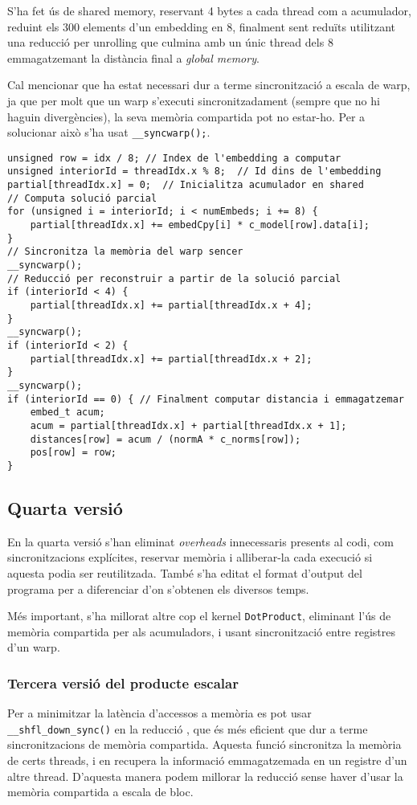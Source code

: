 \documentclass[catalan,10pt,a4paper]{article}
\begin{document}
S'ha fet ús de shared memory, reservant 4 bytes a cada thread com a acumulador, reduint els 300 elements d'un embedding en 8, finalment sent reduïts utilitzant una reducció per unrolling que culmina amb un únic thread dels 8 emmagatzemant la distància final a \textit{global memory}.

Cal mencionar que ha estat necessari dur a terme sincronització a escala de warp, ja que per molt que un warp s'executi sincronitzadament (sempre que no hi haguin divergències), la seva memòria compartida pot no estar-ho. Per a solucionar això s'ha usat \verb|__syncwarp();|.
\begin{verbatim}
unsigned row = idx / 8; // Index de l'embedding a computar
unsigned interiorId = threadIdx.x % 8;  // Id dins de l'embedding
partial[threadIdx.x] = 0;  // Inicialitza acumulador en shared
// Computa solució parcial
for (unsigned i = interiorId; i < numEmbeds; i += 8) {
	partial[threadIdx.x] += embedCpy[i] * c_model[row].data[i];
}
// Sincronitza la memòria del warp sencer
__syncwarp();
// Reducció per reconstruir a partir de la solució parcial
if (interiorId < 4) {
	partial[threadIdx.x] += partial[threadIdx.x + 4];
}
__syncwarp();
if (interiorId < 2) {
	partial[threadIdx.x] += partial[threadIdx.x + 2];
}
__syncwarp();
if (interiorId == 0) { // Finalment computar distancia i emmagatzemar
	embed_t acum;
	acum = partial[threadIdx.x] + partial[threadIdx.x + 1];
	distances[row] = acum / (normA * c_norms[row]);
	pos[row] = row;
}
\end{verbatim}
\subsection*{Quarta versió}
En la quarta versió s'han eliminat \textit{overheads} innecessaris presents al codi, com sincronitzacions explícites, reservar memòria i alliberar-la cada execució si aquesta podia ser reutilitzada. També s'ha editat el format d'output del programa per a diferenciar d'on s'obtenen els diversos temps.

Més important, s'ha millorat altre cop el kernel \verb|DotProduct|, eliminant l'ús de memòria compartida per als acumuladors, i usant sincronització entre registres d'un warp.

\subsubsection*{Tercera versió del producte escalar}
Per a minimitzar la latència d'accessos a memòria es pot usar \verb|__shfl_down_sync()| en la reducció \cite{UsingCUD95:online}, que és més eficient que dur a terme sincronitzacions de memòria compartida. Aquesta funció sincronitza la memòria de certs threads, i en recupera la informació emmagatzemada en un registre d'un altre thread. D'aquesta manera podem millorar la reducció sense haver d'usar la memòria compartida a escala de bloc.
\end{document}
